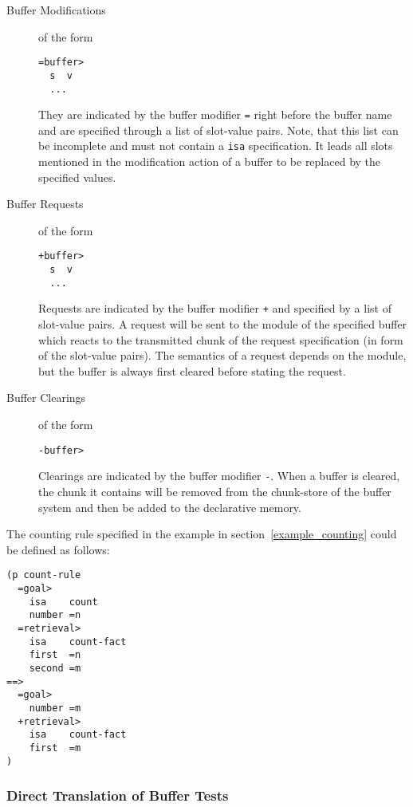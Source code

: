 \begin{description}
 \item[Buffer Modifications] of the form
\begin{lstlisting}
=buffer>
  s  v
  ...
\end{lstlisting}

They are indicated by the buffer modifier \verb|=| right before the buffer name and are specified through a list of slot-value pairs. Note, that this list can be incomplete and must not contain a \verb|isa| specification. It leads all slots mentioned in the modification action of a buffer to be replaced by the specified values.

 \item[Buffer Requests] of the form
\begin{lstlisting}
+buffer>
  s  v
  ...
\end{lstlisting}

Requests are indicated by the buffer modifier \verb|+| and specified by a list of slot-value pairs. A request will be sent to the module of the specified buffer which reacts to the transmitted chunk of the request specification (in form of the slot-value pairs). The semantics of a request depends on the module, but the buffer is always first cleared before stating the request.
 \item[Buffer Clearings] of the form
 
\begin{lstlisting}
-buffer>
\end{lstlisting}

Clearings are indicated by the buffer modifier \verb|-|. When a buffer is cleared, the chunk it contains will be removed from the chunk-store of the buffer system and then be added to the declarative memory. 
\end{description}


\begin{example}
\label{ex:counting}
The counting rule specified in the example in section~\ref{example_counting} could be defined as follows:

\begin{lstlisting}
(p count-rule
  =goal> 
    isa    count
    number =n
  =retrieval>
    isa    count-fact
    first  =n
    second =m
==>
  =goal>
    number =m
  +retrieval>
    isa    count-fact
    first  =m
)
\end{lstlisting}
\end{example}

\subsubsection{Direct Translation of Buffer Tests}

